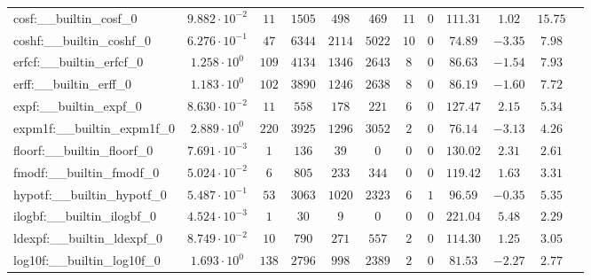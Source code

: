 \begin{tabular}{|l|c|c|c|c|c|c|c|c|c|c|c|}
cosf:\_\_builtin\_cosf\_0                 & $ 9.882 \cdot 10^{-2} $ & $ 11     $ & $ 1505   $ & $ 498   $ & $ 469   $ & $ 11  $ & $ 0 $ & $ 111.31      $ & $ 1.02    $ & $ 15.75   $ \\
coshf:\_\_builtin\_coshf\_0               & $ 6.276 \cdot 10^{-1} $ & $ 47     $ & $ 6344   $ & $ 2114  $ & $ 5022  $ & $ 10  $ & $ 0 $ & $ 74.89       $ & $ -3.35   $ & $ 7.98    $ \\
erfcf:\_\_builtin\_erfcf\_0               & $ 1.258 \cdot 10^{0}  $ & $ 109    $ & $ 4134   $ & $ 1346  $ & $ 2643  $ & $ 8   $ & $ 0 $ & $ 86.63       $ & $ -1.54   $ & $ 7.93    $ \\
erff:\_\_builtin\_erff\_0                 & $ 1.183 \cdot 10^{0}  $ & $ 102    $ & $ 3890   $ & $ 1246  $ & $ 2638  $ & $ 8   $ & $ 0 $ & $ 86.19       $ & $ -1.60   $ & $ 7.72    $ \\
expf:\_\_builtin\_expf\_0                 & $ 8.630 \cdot 10^{-2} $ & $ 11     $ & $ 558    $ & $ 178   $ & $ 221   $ & $ 6   $ & $ 0 $ & $ 127.47      $ & $ 2.15    $ & $ 5.34    $ \\
expm1f:\_\_builtin\_expm1f\_0             & $ 2.889 \cdot 10^{0}  $ & $ 220    $ & $ 3925   $ & $ 1296  $ & $ 3052  $ & $ 2   $ & $ 0 $ & $ 76.14       $ & $ -3.13   $ & $ 4.26    $ \\
floorf:\_\_builtin\_floorf\_0             & $ 7.691 \cdot 10^{-3} $ & $ 1      $ & $ 136    $ & $ 39    $ & $ 0     $ & $ 0   $ & $ 0 $ & $ 130.02      $ & $ 2.31    $ & $ 2.61    $ \\
fmodf:\_\_builtin\_fmodf\_0               & $ 5.024 \cdot 10^{-2} $ & $ 6      $ & $ 805    $ & $ 233   $ & $ 344   $ & $ 0   $ & $ 0 $ & $ 119.42      $ & $ 1.63    $ & $ 3.31    $ \\
hypotf:\_\_builtin\_hypotf\_0             & $ 5.487 \cdot 10^{-1} $ & $ 53     $ & $ 3063   $ & $ 1020  $ & $ 2323  $ & $ 6   $ & $ 1 $ & $ 96.59       $ & $ -0.35   $ & $ 5.35    $ \\
ilogbf:\_\_builtin\_ilogbf\_0             & $ 4.524 \cdot 10^{-3} $ & $ 1      $ & $ 30     $ & $ 9     $ & $ 0     $ & $ 0   $ & $ 0 $ & $ 221.04      $ & $ 5.48    $ & $ 2.29    $ \\
ldexpf:\_\_builtin\_ldexpf\_0             & $ 8.749 \cdot 10^{-2} $ & $ 10     $ & $ 790    $ & $ 271   $ & $ 557   $ & $ 2   $ & $ 0 $ & $ 114.30      $ & $ 1.25    $ & $ 3.05    $ \\
log10f:\_\_builtin\_log10f\_0             & $ 1.693 \cdot 10^{0}  $ & $ 138    $ & $ 2796   $ & $ 998   $ & $ 2389  $ & $ 2   $ & $ 0 $ & $ 81.53       $ & $ -2.27   $ & $ 2.77    $ \\

\end{tabular}
